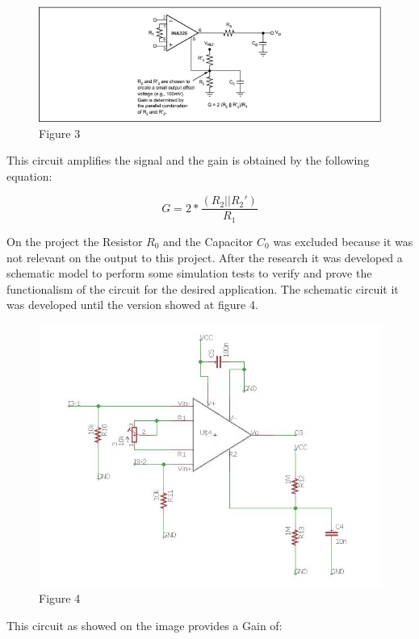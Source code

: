 \begin{figure}[!htpb]
\centering
\includegraphics[scale=0.8]{textual-elements/hardware/Texas}
\caption{Figure 3}
\end{figure}

This circuit amplifies the signal and the gain is obtained by the following equation:

$$G=2*\frac{(R_2||R_2 ')}{R_1}$$

On the project the Resistor $R_0$ and the Capacitor $C_0$ was excluded because it was not relevant on the output to this project. After the research it was developed a schematic model to perform some simulation tests to verify and prove the functionalism of the circuit for the desired application. The schematic circuit it was developed until the version showed at figure 4.

\begin{figure}[!htpb]
\centering
\includegraphics[scale=0.7]{textual-elements/hardware/INA}
\caption{Figure 4}
\end{figure}

This circuit as showed on the image provides a Gain of:

